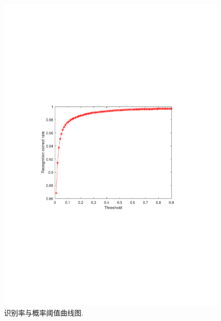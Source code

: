 \begin{figure}[!t]
	\centering
	\includegraphics[width=\textwidth]{figures/threashold}
	\caption{识别率与概率阈值曲线图.}
	\label{fig:threshold}
\end{figure}
